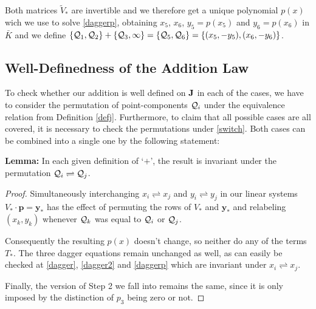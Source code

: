 \documentclass[english,11pt,a4paper]{article}
\begin{document}
  Both matrices $\tilde V_{\ast}$ are invertible and we therefore get a unique polynomial $p(x)$ wich we use to solve \eqref{daggerp}, obtaining $x_5$, $x_6$, $y_5=p(x_5)$ and $y_6=p(x_6)$ in $\bar K$ and we define $\{ \mathcal{Q}_1 , \mathcal{Q}_2\}+\{ \mathcal{Q}_3 , \infty \} = \{ \mathcal{Q}_5 , \mathcal{Q}_6 \} = \{(x_5,-y_5),(x_6,-y_6)\}$.

\subsection{Well-Definedness of the Addition Law}

To check whether our addition is well defined on $\mathbf{J}$ in each of the cases, we have to consider the permutation of point-components $\mathcal{Q}_i$ under the equivalence relation from Definition \ref{defj}. Furthermore, to claim that all possible cases are all covered, it is necessary to check the permutations under \eqref{switch}. Both cases can be combined into a single one by the following statement:

\textbf{Lemma:} In each given definition of `$+$', the result is invariant under the permutation $\mathcal{Q}_i \rightleftharpoons \mathcal{Q}_j$.

\begin{proof}
  Simultaneously interchanging $x_i \rightleftharpoons x_j$ and $y_i \rightleftharpoons y_j$ in our linear systems $V_{\ast} \cdot \mathbf{p} = \mathbf{y}_{\ast}$ has the effect of permuting the rows of $V_{\ast}$ and $\mathbf{y}_{\ast}$ and relabeling $(x_k,y_k)$ whenever $\mathcal{Q}_k$ was equal to $\mathcal{Q}_i$ or $\mathcal{Q}_j$.

  Consequently the resulting $p(x)$ doesn't change, so neither do any of the terms $T_{\ast}$. The three dagger equations remain unchanged as well, as can easily be checked at \eqref{dagger}, \eqref{dagger2} and \eqref{daggerp} which are invariant under $x_i \rightleftharpoons x_j$.

  Finally, the version of Step 2 we fall into remains the same, since it is only imposed by the distinction of $p_3$ being zero or not.
\end{proof}

\end{document}
